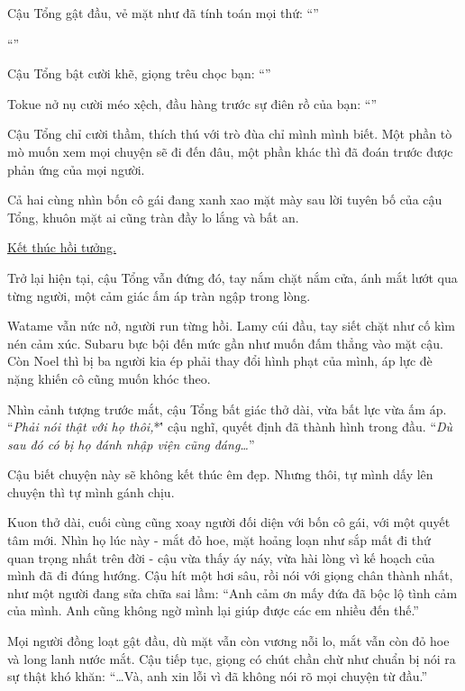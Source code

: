 \documentclass[../main.tex]{subfiles}
\begin{document}
Cậu Tổng gật đầu, vẻ mặt như đã tính toán mọi thứ: ``''

``''

Cậu Tổng bật cười khẽ, giọng trêu chọc bạn: ``''

Tokue nở nụ cười méo xệch, đầu hàng trước sự điên rồ của bạn: ``''

Cậu Tổng chỉ cười thầm, thích thú với trò đùa chỉ mình mình biết. Một phần tò mò muốn xem mọi chuyện sẽ đi đến đâu, một phần khác thì đã đoán trước được phản ứng của mọi người.

Cả hai cùng nhìn bốn cô gái đang xanh xao mặt mày sau lời tuyên bố của cậu Tổng, khuôn mặt ai cũng tràn đầy lo lắng và bất an.

\begin{center}
  \uline{Kết thúc hồi tưởng.}
\end{center}

Trở lại hiện tại, cậu Tổng vẫn đứng đó, tay nắm chặt nắm cửa, ánh mắt lướt qua từng người, một cảm giác ấm áp tràn ngập trong lòng.

Watame vẫn nức nở, người run từng hồi. Lamy cúi đầu, tay siết chặt như cố kìm nén cảm xúc. Subaru bực bội đến mức gần như muốn đấm thẳng vào mặt cậu. Còn Noel thì bị ba người kia ép phải thay đổi hình phạt của mình, áp lực đè nặng khiến cô cũng muốn khóc theo.

Nhìn cảnh tượng trước mắt, cậu Tổng bất giác thở dài, vừa bất lực vừa ấm áp. ``\textit{Phải nói thật với họ thôi,}*\'' cậu nghĩ, quyết định đã thành hình trong đầu. ``\textit{Dù sau đó có bị họ đánh nhập viện cũng đáng\dots}''

Cậu biết chuyện này sẽ không kết thúc êm đẹp. Nhưng thôi, tự mình dấy lên chuyện thì tự mình gánh chịu.

Kuon thở dài, cuối cùng cũng xoay người đối diện với bốn cô gái, với một quyết tâm mới. Nhìn họ lúc này - mắt đỏ hoe, mặt hoảng loạn như sắp mất đi thứ quan trọng nhất trên đời - cậu vừa thấy áy náy, vừa hài lòng vì kế hoạch của mình đã đi đúng hướng. Cậu hít một hơi sâu, rồi nói với giọng chân thành nhất, như một người đang sửa chữa sai lầm: ``Anh cảm ơn mấy đứa đã bộc lộ tình cảm của mình. Anh cũng không ngờ mình lại giúp được các em nhiều đến thế.''

Mọi người đồng loạt gật đầu, dù mặt vẫn còn vương nỗi lo, mắt vẫn còn đỏ hoe và long lanh nước mắt. Cậu tiếp tục, giọng có chút chần chừ như chuẩn bị nói ra sự thật khó khăn: ``\dots Và, anh xin lỗi vì đã không nói rõ mọi chuyện từ đầu.''
\end{document}

